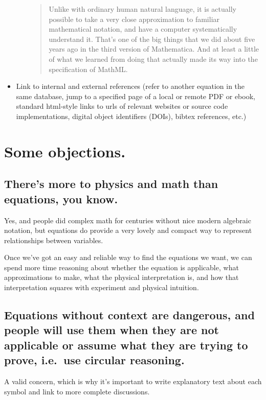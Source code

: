 \documentclass[12pt,letterpaper]{article}
\begin{document}
\begin{itemize}
\begin{enumerate}
\begin{quote}
                Unlike with ordinary human natural language,
                it is actually possible to take a very close approximation to familiar mathematical notation,
                and have a computer systematically understand it.
                That's one of the big things that we did about five years ago in the third version of Mathematica.
                And at least a little of what we learned from doing that actually made its way into the specification of MathML. 
                \end{quote}
      \end{enumerate}
\item Link to internal and external references
      (refer to another equation in the same database,
      jump to a specified page of a local or remote PDF or ebook,
      standard html-style links to  urls of relevant websites or source code implementations,
      digital object identifiers (DOIs),
      bibtex references, etc.) \label{itm:linking}
\end{itemize}

\section{Some objections.}

\subsection{There's more to physics and math than equations, you know.}

Yes, and people did complex math for centuries without nice modern algebraic notation,
but equations do provide a very lovely and compact way to represent relationships between variables.

Once we've got an easy and reliable way to find the equations we want,
we can spend more time reasoning about whether the equation is applicable,
what approximations to make,
what the physical interpretation is,
and how that interpretation squares with experiment and physical intuition.

\subsection{Equations without context are dangerous,
            and people will use them when they are not applicable or assume what they are trying to prove,
            i.e.\ use circular reasoning.}

A valid concern,
which is why it's important to write explanatory text about each symbol
and link to more complete discussions.
\end{document}
